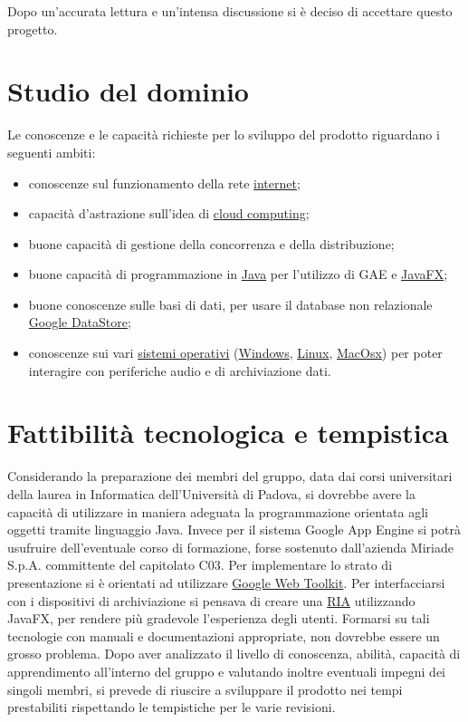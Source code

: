 Dopo un'accurata lettura e un'intensa discussione si \`e deciso di accettare
questo progetto.

\section{Studio del dominio} 
Le conoscenze e le capacit\`a richieste per lo sviluppo del prodotto
riguardano i seguenti ambiti:
\begin{itemize}
  \item conoscenze sul funzionamento della rete \underline{internet};
  \item capacit\`a d'astrazione sull'idea di \underline{cloud computing};
  \item buone capacit\`a di gestione della concorrenza e della distribuzione;
  \item buone capacit\`a di programmazione in \underline{Java} per l'utilizzo di
  GAE e \underline{JavaFX};
  \item buone conoscenze sulle basi di dati, per usare il database
  non relazionale \underline{Google DataStore};
  \item conoscenze sui vari \underline{sistemi operativi} (\underline{Windows},
  \underline{Linux}, \underline{MacOsx}) per poter interagire con periferiche
  audio e di archiviazione dati.
\end{itemize}

\section{Fattibilit\`a tecnologica e tempistica}
Considerando la preparazione dei membri del gruppo, data dai corsi universitari
della laurea in Informatica dell'Universit\`a di Padova, si dovrebbe avere la
capacit\`a di utilizzare in maniera adeguata la programmazione orientata agli
oggetti tramite linguaggio Java. Invece per il sistema Google App Engine si
potr\`a usufruire dell'eventuale corso di formazione, forse sostenuto
dall'azienda Miriade S.p.A. committente del capitolato C03.
Per implementare lo strato di presentazione si \`e orientati ad utilizzare
\underline{Google Web Toolkit}. Per interfacciarsi con i dispositivi di
archiviazione si pensava di creare una \underline{RIA} utilizzando JavaFX, per
rendere pi\`u gradevole l'esperienza degli utenti. Formarsi su tali tecnologie con manuali e
documentazioni appropriate, non dovrebbe essere un grosso problema. Dopo aver
analizzato il livello di conoscenza, abilit\`a, capacit\`a di apprendimento
all'interno del gruppo e valutando inoltre eventuali impegni dei singoli membri,
si prevede di riuscire a sviluppare il prodotto nei tempi prestabiliti
rispettando le tempistiche per le varie revisioni.

